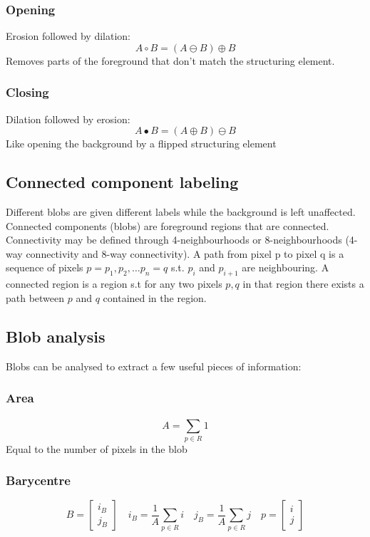 \documentclass{article}
\begin{document}
\subsubsection{Opening}
Erosion followed by dilation:
\[
    A \circ B = (A\ominus B) \oplus B
\]
Removes parts of the foreground that don't match the structuring element.
\subsubsection{Closing}
Dilation followed by erosion:
\[
    A \bullet B = (A\oplus B) \ominus B
\]
Like opening the background by a flipped structuring element

\subsection{Connected component labeling}
Different blobs are given different labels while the background is left unaffected. Connected components (blobs) are foreground regions that are connected. Connectivity may be defined through 4-neighbourhoods or 8-neighbourhoods (4-way connectivity and 8-way connectivity). A path from pixel p to pixel q is a sequence of pixels $p=p_1,p_2,\dots p_n =q$ s.t. $p_i$ and $p_{i+1}$ are neighbouring. A connected region is a region s.t for any two pixels $p,q$ in that region there exists a path between $p$ and $q$ contained in the region.
\subsection{Blob analysis}
Blobs can be analysed to extract a few useful pieces of information:
\subsubsection{Area}
\[
    A = \displaystyle\sum_{p\in R}^{}1 
\]
Equal to the number of pixels in the blob
\subsubsection{Barycentre}
\[
    B = \begin{bmatrix}
        i_B \\ j_B
    \end{bmatrix} \quad i_B =\displaystyle\frac{1}{A}\displaystyle\sum_{p\in R}^{}i \quad j_B =\displaystyle\frac{1}{A}\displaystyle\sum_{p\in R}^{}j \quad p = \begin{bmatrix}
        i \\ j
    \end{bmatrix}
\]
\end{document}
